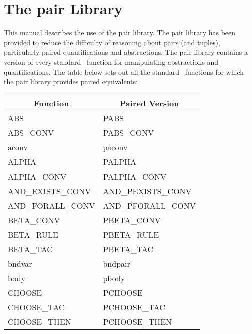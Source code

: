 \chapter{The pair Library}

This manual describes the use of the pair library.
The pair library has been provided to reduce the difficulty of reasoning
about pairs (and tuples), particularly paired quantifications and abstractions.
The pair library contains a version of every standard \HOL\ function
for manipulating abstractions and quantifications.
The table below sets out all the standard \HOL\ functions for which the
pair library provides paired equivalents:
{\tiny \begin{center}
    \begin{tabular}[t]{|l|l|}                                           \hline
        \multicolumn{1}{|c|}{\normalsize Function}
    &   \multicolumn{1}{|c|}{\normalsize Paired Version}\\              \hline
        ABS                         &   PABS                        \\
        ABS\_CONV                   &   PABS\_CONV                  \\
        aconv                       &   paconv                      \\
        ALPHA                       &   PALPHA                      \\
        ALPHA\_CONV                 &   PALPHA\_CONV                \\
        AND\_EXISTS\_CONV           &   AND\_PEXISTS\_CONV          \\
        AND\_FORALL\_CONV           &   AND\_PFORALL\_CONV          \\
        BETA\_CONV                  &   PBETA\_CONV                 \\
        BETA\_RULE                  &   PBETA\_RULE                 \\
        BETA\_TAC                   &   PBETA\_TAC                  \\
        bndvar                      &   bndpair                     \\
        body                        &   pbody                       \\
        CHOOSE                      &   PCHOOSE                     \\
        CHOOSE\_TAC                 &   PCHOOSE\_TAC                \\
        CHOOSE\_THEN                &   PCHOOSE\_THEN               \\

\end{tabular}
\end{center}}
